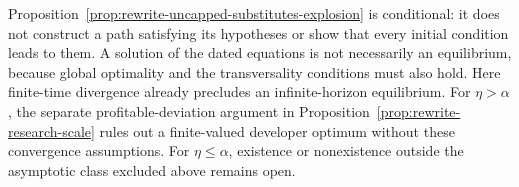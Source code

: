 Proposition~\ref{prop:rewrite-uncapped-substitutes-explosion} is conditional:
it does not construct a path satisfying its hypotheses or show that every
initial condition leads to them. A solution of the dated equations is not
necessarily an equilibrium, because global optimality and the transversality
conditions must also hold. Here finite-time divergence already precludes an
infinite-horizon equilibrium. For $\eta>\alpha$, the separate profitable-deviation
argument in Proposition~\ref{prop:rewrite-research-scale} rules out a
finite-valued developer optimum without these convergence assumptions.
For $\eta\leq\alpha$, existence or nonexistence outside the asymptotic class
excluded above remains open.

